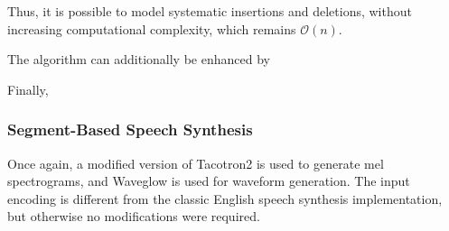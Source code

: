 Thus, it is possible to model systematic insertions and deletions, without increasing computational 
complexity, which remains $\mathcal{O}(n)$.

The algorithm can additionally be enhanced by 


Finally, 

\subsubsection{Segment-Based Speech Synthesis}
Once again, a modified version of Tacotron2 is used to generate mel spectrograms, 
and Waveglow is used for waveform generation. The input encoding is different from the classic 
English speech synthesis implementation, but otherwise no modifications were required.


